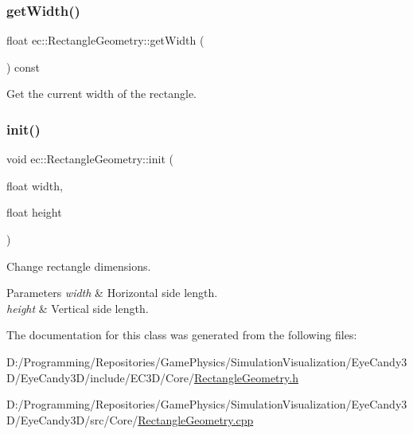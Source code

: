 \mbox{\label{classec_1_1_rectangle_geometry_a1f75cd7d531e23fe3ccaff67178e0a08}} 
\subsubsection{\texorpdfstring{get\+Width()}{getWidth()}}
{\footnotesize\ttfamily float ec\+::\+Rectangle\+Geometry\+::get\+Width (\begin{DoxyParamCaption}{ }\end{DoxyParamCaption}) const}



Get the current width of the rectangle. 

\mbox{\label{classec_1_1_rectangle_geometry_ac6dd804a2fa2b253b71408dae5a08265}} 
\subsubsection{\texorpdfstring{init()}{init()}}
{\footnotesize\ttfamily void ec\+::\+Rectangle\+Geometry\+::init (\begin{DoxyParamCaption}\item[{float}]{width,  }\item[{float}]{height }\end{DoxyParamCaption})}



Change rectangle dimensions. 


\begin{DoxyParams}{Parameters}
{\em width} & Horizontal side length. \\
\hline
{\em height} & Vertical side length. \\
\hline
\end{DoxyParams}


The documentation for this class was generated from the following files\+:\begin{DoxyCompactItemize}
\item 
D\+:/\+Programming/\+Repositories/\+Game\+Physics/\+Simulation\+Visualization/\+Eye\+Candy3\+D/\+Eye\+Candy3\+D/include/\+E\+C3\+D/\+Core/\mbox{\hyperlink{_rectangle_geometry_8h}{Rectangle\+Geometry.\+h}}\item 
D\+:/\+Programming/\+Repositories/\+Game\+Physics/\+Simulation\+Visualization/\+Eye\+Candy3\+D/\+Eye\+Candy3\+D/src/\+Core/\mbox{\hyperlink{_rectangle_geometry_8cpp}{Rectangle\+Geometry.\+cpp}}\end{DoxyCompactItemize}

